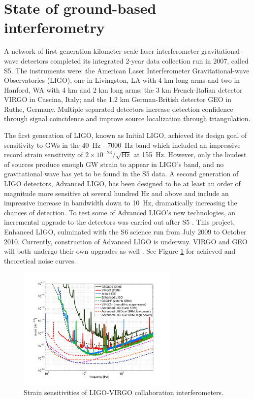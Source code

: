 \section{State of ground-based interferometry}
A network of first generation kilometer scale laser interferometer
gravitational-wave detectors completed its integrated 2-year data
collection run in 2007, called S5. The instruments were: the American
Laser Interferometer Gravitational-wave Observatories (LIGO)\cite{Abbott2009LIGO},
one in Livingston, LA with 4 km long arms and two in Hanford, WA with
4 km and 2 km long arms; the 3 km French-Italian detector
VIRGO\cite{Acernese2008Virgo} in Cascina, Italy; and the 1.2 km
German-British detector GEO\cite{Luck2006Status} in Ruthe, Germany. Multiple
separated detectors increase detection confidence through signal
coincidence and improve source localization through triangulation.

The first generation of LIGO, known as Initial LIGO, achieved its
design goal of sensitivity to GWs in the 40~Hz - 7000~Hz band which
included an impressive record strain sensitivity of
$2\times10^{-23}/\sqrt{\mathrm{Hz}}$ at 155~Hz. However, only the
loudest of sources produce enough GW strain to appear in LIGO's band,
and no gravitational wave has yet to be found in the S5 data. A second
generation of LIGO detectors, Advanced LIGO, has been designed to be
at least an order of magnitude more sensitive at several hundred Hz
and above and include an impressive increase in bandwidth down to
10~Hz, dramatically increasing the chances of detection. To test some
of Advanced LIGO's new technologies, an incremental upgrade to the
detectors was carried out after S5 \cite{Adhikari2006Enhanced}. This
project, Enhanced LIGO, culminated with the S6 science run from July
2009 to October 2010. Currently, construction of Advanced LIGO is
underway. VIRGO and GEO will both undergo their own upgrades as well
\cite{Acernese2008Virgo} \cite{Luck2010Upgrade}. See Figure
\ref{fig:h_all} for achieved and theoretical noise curves.

\begin{figure}
\begin{centering}
\includegraphics[width=0.7\textwidth]{figures/GWnetwork_sensitivities.pdf}
\caption{Strain sensitivities of LIGO-VIRGO collaboration interferometers.}
\label{fig:h_all}
\end{centering}
\end{figure}

